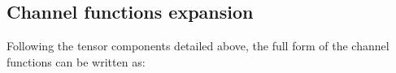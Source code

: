 \documentclass[10pt]{article}
\begin{document}





\subsection{Channel functions expansion\label{sec:channel-funs-full}}

Following the tensor components detailed above, the full form of the channel functions can be written as:




\end{document}
